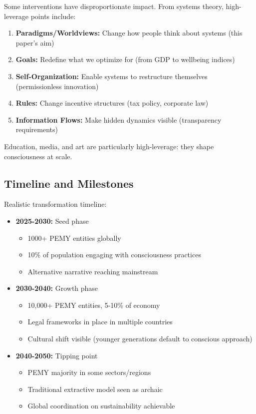 \documentclass[11pt,a4paper]{article}
\theoremstyle{definition}
\theoremstyle{remark}
\begin{document}
Some interventions have disproportionate impact. From systems theory, high-leverage points include:

\begin{enumerate}
    \item \textbf{Paradigms/Worldviews:} Change how people think about systems (this paper's aim)
    \item \textbf{Goals:} Redefine what we optimize for (from GDP to wellbeing indices)
    \item \textbf{Self-Organization:} Enable systems to restructure themselves (permissionless innovation)
    \item \textbf{Rules:} Change incentive structures (tax policy, corporate law)
    \item \textbf{Information Flows:} Make hidden dynamics visible (transparency requirements)
\end{enumerate}

Education, media, and art are particularly high-leverage: they shape consciousness at scale.

\subsection{Timeline and Milestones}

Realistic transformation timeline:

\begin{itemize}
    \item \textbf{2025-2030:} Seed phase
    \begin{itemize}
        \item 1000+ PEMY entities globally
        \item 10\% of population engaging with consciousness practices
        \item Alternative narrative reaching mainstream
    \end{itemize}
    
    \item \textbf{2030-2040:} Growth phase
    \begin{itemize}
        \item 10,000+ PEMY entities, 5-10\% of economy
        \item Legal frameworks in place in multiple countries
        \item Cultural shift visible (younger generations default to conscious approach)
    \end{itemize}
    
    \item \textbf{2040-2050:} Tipping point
    \begin{itemize}
        \item PEMY majority in some sectors/regions
        \item Traditional extractive model seen as archaic
        \item Global coordination on sustainability achievable
    \end{itemize}
\end{itemize}
\end{document}
